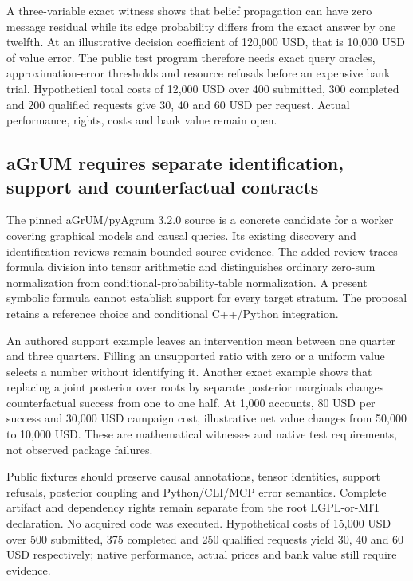A three-variable exact witness shows that belief propagation can have
zero message residual while its edge probability differs from the exact
answer by one twelfth. At an illustrative decision coefficient of
120,000 USD, that is 10,000 USD of value error. The public test program
therefore needs exact query oracles, approximation-error thresholds and
resource refusals before an expensive bank trial. Hypothetical total
costs of 12,000 USD over 400 submitted, 300 completed and 200 qualified
requests give 30, 40 and 60 USD per request. Actual performance, rights,
costs and bank value remain open. \citep{exec24_libdai_choice}

\hypertarget{agrum-requires-separate-identification-support-and-counterfactual-contracts}{%
\subsection{aGrUM requires separate identification, support and
counterfactual
contracts}\label{agrum-requires-separate-identification-support-and-counterfactual-contracts}}

The pinned aGrUM/pyAgrum 3.2.0 source is a concrete candidate for a
worker covering graphical models and causal queries. Its existing
discovery and identification reviews remain bounded source evidence. The
added review traces formula division into tensor arithmetic and
distinguishes ordinary zero-sum normalization from
conditional-probability-table normalization. A present symbolic formula
cannot establish support for every target stratum. The proposal retains
a reference choice and conditional C++/Python integration.
\citep{exec24_agrum_source,exec24_agrum_choice}

An authored support example leaves an intervention mean between one
quarter and three quarters. Filling an unsupported ratio with zero or a
uniform value selects a number without identifying it. Another exact
example shows that replacing a joint posterior over roots by separate
posterior marginals changes counterfactual success from one to one half.
At 1,000 accounts, 80 USD per success and 30,000 USD campaign cost,
illustrative net value changes from 50,000 to 10,000 USD. These are
mathematical witnesses and native test requirements, not observed
package failures. \citep{exec24_agrum_choice}

Public fixtures should preserve causal annotations, tensor identities,
support refusals, posterior coupling and Python/CLI/MCP error semantics.
Complete artifact and dependency rights remain separate from the root
LGPL-or-MIT declaration. No acquired code was executed. Hypothetical
costs of 15,000 USD over 500 submitted, 375 completed and 250 qualified
requests yield 30, 40 and 60 USD respectively; native performance,
actual prices and bank value still require evidence.
\citep{exec24_agrum_source,exec24_agrum_choice}

